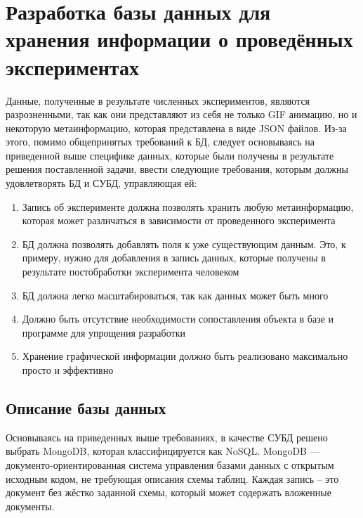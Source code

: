 \documentclass[14pt]{extreport}
\begin{document}
\chapter{Разработка базы данных для хранения информации о проведённых экспериментах}

Данные, полученные в результате численных экспериментов, являются разрозненными, так как они представляют из себя не только GIF анимацию, но и некоторую метаинформацию, которая представлена в виде JSON файлов. Из-за этого, помимо общепринятых требований к БД, следует основываясь на приведенной выше специфике данных, которые были получены в результате решения поставленной задачи, ввести следующие требования, которым должны удовлетворять БД и СУБД, управляющая ей:

\begin{enumerate}

\item Запись об эксперименте должна позволять хранить любую метаинформацию, которая может различаться в зависимости от проведенного эксперимента

\item БД должна позволять добавлять поля к уже существующим данным. Это, к примеру, нужно для добавления в запись данных, которые получены в результате постобработки эксперимента человеком

\item БД должна легко масштабироваться, так как данных может быть много

\item Должно быть отсутствие необходимости сопоставления объекта в базе и программе для упрощения разработки

\item Хранение графической информации должно быть реализовано максимально просто и эффективно

\end{enumerate}

\section{Описание базы данных}

Основываясь на приведенных выше требованиях, в качестве СУБД решено выбрать MongoDB, которая классифицируется как NoSQL. MongoDB — документо-ориентированная система управления базами данных с открытым исходным кодом, не требующая описания схемы таблиц. Каждая запись – это документ без жёстко заданной схемы, который может содержать вложенные документы.
\end{document}
